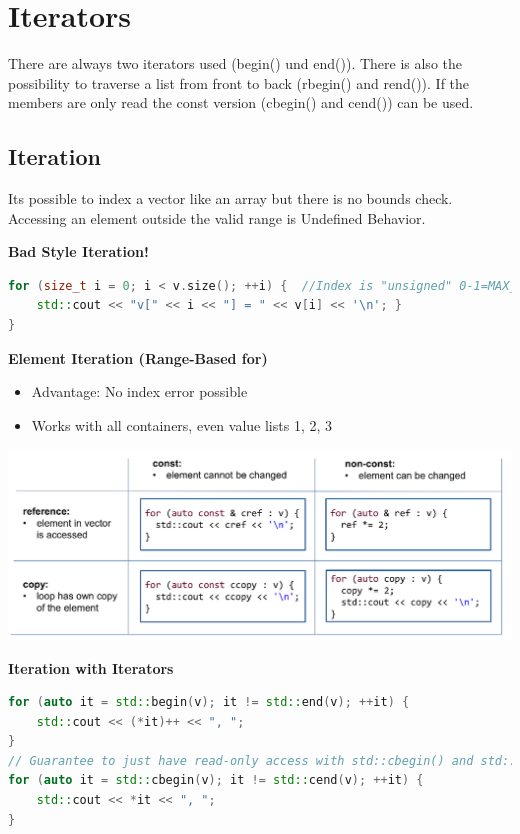 
\section{Iterators}
There are always two iterators used (begin() und end()). There is also the possibility to traverse a list from front to back (rbegin() and rend()). If the members are only read the const version (cbegin() and cend()) can be used.

\subsection{Iteration}
Its possible to index a vector like an array but there is no bounds check.    Accessing an element outside the valid range is Undefined Behavior.

\textbf{Bad Style Iteration!}\\
\begin{lstlisting}[language=C++]
for (size_t i = 0; i < v.size(); ++i) {  //Index is "unsigned" 0-1=MAX_INT
	std::cout << "v[" << i << "] = " << v[i] << '\n'; }
}	
\end{lstlisting}

\textbf{Element Iteration (Range-Based for)}
\begin{itemize}
  \itemsep -0.5em 
  \item Advantage: No index error possible 
  \item Works with all containers, even value lists {1, 2, 3}
\end{itemize}

\begin{center}
\includegraphics[width=0.75\linewidth]{images/elementiteration}	
\end{center}

\textbf{Iteration with Iterators}
\begin{lstlisting}[language=C++]
for (auto it = std::begin(v); it != std::end(v); ++it) {
	std::cout << (*it)++ << ", "; 
}
// Guarantee to just have read-only access with std::cbegin() and std::cend()
for (auto it = std::cbegin(v); it != std::cend(v); ++it) {
	std::cout << *it << ", "; 
}
\end{lstlisting}

